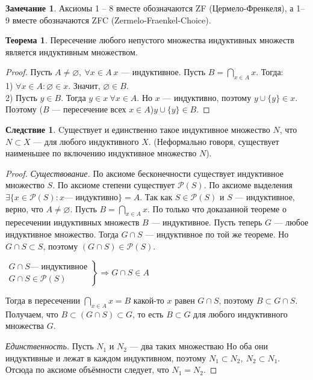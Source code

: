 \documentclass[12pt,oneside]{article}
\theoremstyle{definition}
\newtheorem{theorem}{Теорема}[section]
\newtheorem{remark}{Замечание}[section]
\newtheorem{corollary}{Следствие}[section]
\begin{document}
\begin{remark}
Аксиомы 1 -- 8 вместе обозначаются ZF (Цермело-Френкеля), а 1--9 вместе обозначаются ZFC (Zermelo-Fraenkel-Choice).
\end{remark}

\begin{theorem}\label{per_ind_ind}
Пересечение любого непустого множества индуктивных множеств является индуктивным множеством.
\begin{proof}
Пусть $A\neq\varnothing,\ \forall x\in A\ x$ --- индуктивное. Пусть $B = \bigcap_{x\in A}x$. Тогда:
\\1) $\forall x\in A : \varnothing\in x$. Значит, $\varnothing\in B$.
\\2) Пусть $y\in B$. Тогда $y\in x\ \forall x\in A$. Но $x$ --- индуктивно, поэтому $y\cup \{y\}\in x$. Поэтому ($B$ --- пересечение всех $x\in A$)$y\cup \{y\}\in B$.
\end{proof}
\end{theorem}
\begin{corollary}\label{coroll_min}
Cуществует и единственно такое индуктивное множество $N$, что $N\subset X$ --- для любого индуктивного $X$. (Неформально говоря, существует наименьшее по включению индуктивное множество $N$).
\begin{proof}

\textit{Существование.} По аксиоме бесконечности существует индуктивное множество $S$. По аксиоме степени существует $\mathcal{P}(S)$. По аксиоме выделения $\exists \{x\in\mathcal{P}(S): x \textrm{--- индуктивно}\} = A$. Так как $S\in \mathcal{P}(S)$ и $S$ --- индуктивное, верно, что $A\neq \varnothing$. Пусть $B = \bigcap_{x\in A} x$. По только что доказанной теореме о пересечении индуктивных множеств $B$ --- индуктивное. Пусть теперь $G$ --- любое индуктивное множество. Тогда $G\cap S$ --- индуктивное по той же теореме. Но $G\cap S \subset S$, поэтому $(G\cap S)\in \mathcal{P}(S)$.

$
\left.
\begin{array}{c}
     G\cap S \textrm{--- индуктивное} \\
     G\cap S\in \mathcal{P}(S)
\end{array}
\right\}
\Longrightarrow G\cap S\in A
$

Тогда в пересечении $\bigcap_{x\in A} x=B$ какой-то $x$ равен $G\cap S$, поэтому $B\subset G\cap S$. Получаем, что $B\subset (G\cap S)\subset G$, то есть $B\subset G$ для любого индуктивного множества $G$.

\textit{Единственность.} Пусть $N_1$ и $N_2$ ---  два таких множестваю Но оба они индуктивные и лежат в каждом индуктивном, поэтому $N_1\subset N_2,\ N_2\subset N_1$. Отсюда по аксиоме объёмности следует, что $N_1 = N_2$.
\end{proof}
\end{corollary}
\end{document}
